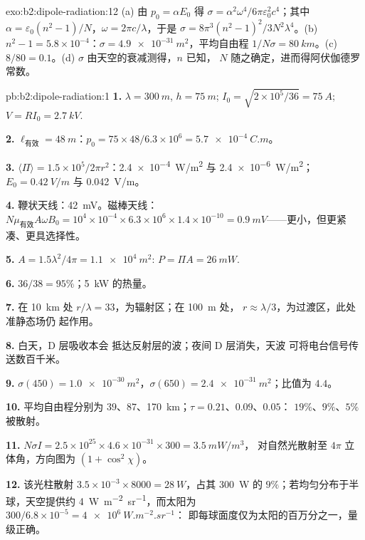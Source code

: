 \begin{solution}{exo:b2:dipole-radiation:12}
(a) 由 $p_0 = \alpha E_0$ 得 $\sigma = \alpha^2\omega^4/6\pi\varepsilon_0^2c^4$；其中 $\alpha = \varepsilon_0(n^2
- 1)/N$，$\omega = 2\pi c/\lambda$，于是 $\sigma = 8\pi^3(n^2 - 1)^2/3N^2\lambda^4$。(b) $n^2 - 1 =
5.8 \times 10^{-4}$：$\sigma = \qty{4.9e-31}{m^2}$，平均自由程 $1/N\sigma = \qty{80}{km}$。(c)
$8/80 = 0.1$。(d) $\sigma$ 由天空的衰减测得，$n$ 已知，
$N$ 随之确定，进而得阿伏伽德罗常数。
\end{solution}

\begin{solution}{pb:b2:dipole-radiation:1}
\textbf{1.} $\lambda = \qty{300}{m}$, $h = \qty{75}{m}$; $I_0 = \sqrt{2 \times 10^5/36} = \qty{75}{A}$;
$V = RI_0 = \qty{2.7}{kV}$.

\textbf{2.} $\ell_{\text{有效}} = \qty{48}{m}$：$p_0 = 75 \times 48/6.3 \times 10^6 = \qty{5.7e-4}{C.m}$。

\textbf{3.} $\langle\Pi\rangle = 1.5 \times 10^5/2\pi r^2$：\qty{2.4e-4}{W/m^2} 与 \qty{2.4e-6}{W/m^2}；
$E_0 = \qty{0.42}{V/m}$ 与 \qty{0.042}{V/m}。

\textbf{4.} 鞭状天线：\qty{42}{mV}。磁棒天线：$N\mu_{\text{有效}}A\omega B_0 = 10^4 \times 10^{-4} \times 6.3 \times
10^6 \times 1.4 \times 10^{-10} = \qty{0.9}{mV}$——更小，但更紧凑、更具选择性。

\textbf{5.} $A = 1.5\lambda^2/4\pi = \qty{1.1e4}{m^2}$: $P = \Pi A = \qty{26}{mW}$.

\textbf{6.} $36/38 = 95\%$；\qty{5}{kW} 的热量。

\textbf{7.} 在 \qty{10}{km} 处 $r/\lambda = 33$，为辐射区；在 \qty{100}{m} 处，
$r \approx \lambda/3$，为过渡区，此处准静态场仍
起作用。

\textbf{8.} 白天，D 层吸收本会
抵达反射层的波；夜间 D 层消失，天波
可将电台信号传送数百千米。

\textbf{9.} $\sigma(450) = \qty{1.0e-30}{m^2}$，$\sigma(650) = \qty{2.4e-31}{m^2}$；比值为 $4.4$。

\textbf{10.} 平均自由程分别为 $39$、$87$、\qty{170}{km}；$\tau = 0.21$、$0.09$、$0.05$：
$19\%$、$9\%$、$5\%$ 被散射。

\textbf{11.} $N\sigma I = 2.5 \times 10^{25} \times 4.6 \times 10^{-31} \times 300 = \qty{3.5}{mW/m^3}$，
对自然光散射至 $4\pi$ 立体角，方向图为 $(1 + \cos^2\chi)$。

\textbf{12.} 该光柱散射 $3.5 \times 10^{-3} \times 8000 = \qty{28}{W}$，占其
\qty{300}{W} 的 $9\%$；若均匀分布于半球，天空提供约
\qty{4}{W.m^{-2}.sr^{-1}}，而太阳为 $300/6.8 \times 10^{-5} = \qty{4e6}{W.m^{-2}.sr^{-1}}$：
即每球面度仅为太阳的百万分之一，量级正确。


\end{solution}
